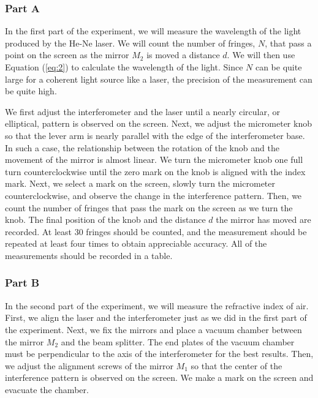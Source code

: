 \documentclass[10pt]{article}
\begin{document}
\subsubsection*{Part A}

In the first part of the experiment, we will measure the wavelength of the light produced by the He-Ne laser. We will count the number of fringes, $N$, that pass a point on the screen as the mirror $M_2$ is moved a distance $d$. We will then use Equation (\ref{eq:2}) to calculate the wavelength of the light. Since $N$ can be quite large for a coherent light source like a laser, the precision of the measurement can be quite high. 

We first adjust the interferometer and the laser until a nearly circular, or elliptical, pattern is observed on the screen. Next, we adjust the micrometer knob so that the lever arm is nearly parallel with the edge of the interferometer base. In such a case, the relationship between the rotation of the knob and the movement of the mirror is almost linear. We turn the micrometer knob one full turn counterclockwise until the zero mark on the knob is aligned with the index mark. Next, we select a mark on the screen, slowly turn the micrometer counterclockwise, and observe the change in the interference pattern. Then, we count the number of fringes that pass the mark on the screen as we turn the knob. The final position of the knob and the distance $d$ the mirror has moved are recorded. At least 30 fringes should be counted, and the measurement should be repeated at least four times to obtain appreciable accuracy. All of the measurements should be recorded in a table.

\subsubsection*{Part B}

In the second part of the experiment, we will measure the refractive index of air. First, we align the laser and the interferometer just as we did in the first part of the experiment. Next, we fix the mirrors and place a vacuum chamber between the mirror $M_2$ and the beam splitter. The end plates of the vacuum chamber must be perpendicular to the axis of the interferometer for the best results. Then, we adjust the alignment screws of the mirror $M_1$ so that the center of the interference pattern is observed on the screen. We make a mark on the screen and evacuate the chamber.
\end{document}
